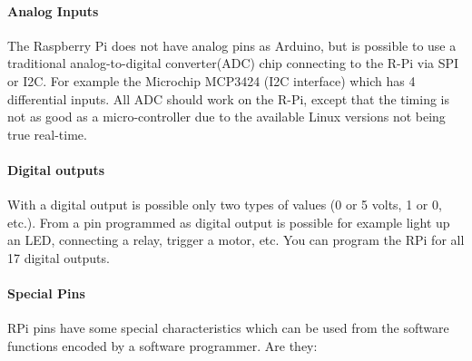 \documentclass{acm_proc_article-sp}
\begin{document}
\paragraph{Analog Inputs}
The Raspberry Pi does not have analog pins as Arduino, but is possible to use a traditional analog-to-digital converter(ADC) chip connecting to the R-Pi via SPI or I2C. For example the Microchip MCP3424 (I2C interface) which has 4 differential inputs. All ADC should work on the R-Pi, except that the timing is not as good as a micro-controller due to the available Linux versions not being true real-time. 

\paragraph{Digital outputs}
With a digital output is possible only two types of values (0 or 5 volts, 1 or 0, etc.). From a pin programmed as digital output is possible for example light up an LED, connecting a relay, trigger a motor, etc. You can program the RPi for all 17 digital outputs.

\paragraph{Special Pins}
RPi pins have some special characteristics which can be used from the software functions encoded by a software programmer. Are they:
\end{document}
